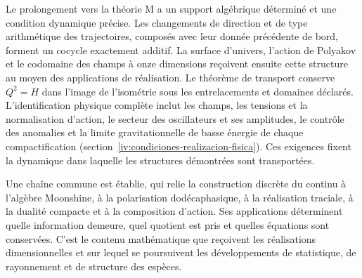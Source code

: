 Le prolongement vers la théorie M a un support algébrique
déterminé et une condition dynamique précise. Les changements de direction
et de type arithmétique des trajectoires, composés avec leur donnée
précédente de bord, forment un cocycle exactement additif.
La surface d’univers, l’action de Polyakov et le codomaine des champs
à onze dimensions reçoivent ensuite cette structure au moyen des applications
de réalisation. Le théorème de transport conserve \(Q^2=H\) dans
l’image de l’isométrie sous les entrelacements et domaines déclarés.
L’identification physique complète inclut les champs, les tensions
et la normalisation d’action, le secteur des oscillateurs et ses amplitudes,
le contrôle des anomalies et la limite gravitationnelle de basse énergie de
chaque compactification
(section~\ref{iv:condiciones-realizacion-fisica}).
Ces exigences fixent la dynamique dans laquelle les
structures démontrées sont transportées.

Une chaîne commune est établie, qui relie la construction discrète
du continu à l’algèbre Moonshine, à la polarisation dodécaphasique,
à la réalisation traciale, à la dualité compacte et à la composition d’action.
Ses applications déterminent quelle information demeure, quel quotient est pris
et quelles équations sont conservées. C’est le contenu mathématique que
reçoivent les réalisations dimensionnelles et sur lequel se poursuivent les
développements de statistique, de rayonnement et de structure des espèces.

\par\endgroup
